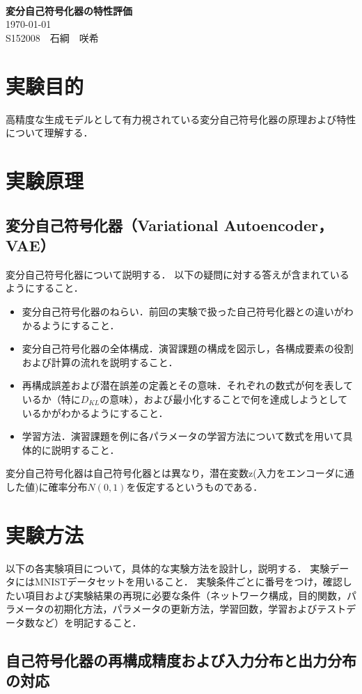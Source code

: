 \documentclass[12pt]{jsarticle}
\newcommand{\frontpage}[3]{%
\begin{center}
　\\
\vspace{15em}{\LARGE{}レポート課題}\\
　\\
{\Huge\bf#1}\\
\vspace{30em}
{\LARGE\today}\\
\vspace{2em}
{\LARGE#2　#3}
\end{center}
\thispagestyle{empty}
\clearpage
\setcounter{page}{1}
}
\begin{document}
\frontpage
{変分自己符号化器の特性評価}
{S152008}
{石綱　咲希}

\section{実験目的}

高精度な生成モデルとして有力視されている変分自己符号化器の原理および特性について理解する．

\section{実験原理}

\subsection{変分自己符号化器（Variational Autoencoder，VAE）}

変分自己符号化器について説明する．
以下の疑問に対する答えが含まれているようにすること．
\begin{itemize}
\item 変分自己符号化器のねらい．前回の実験で扱った自己符号化器との違いがわかるようにすること．
\item 変分自己符号化器の全体構成．演習課題の構成を図示し，各構成要素の役割および計算の流れを説明すること．
\item 再構成誤差および潜在誤差の定義とその意味．それぞれの数式が何を表しているか（特に$D_{KL}$の意味），および最小化することで何を達成しようとしているかがわかるようにすること．
\item 学習方法．演習課題を例に各パラメータの学習方法について数式を用いて具体的に説明すること．
\end{itemize}

変分自己符号化器は自己符号化器とは異なり，潜在変数z(入力をエンコーダに通した値)に確率分布$N(0,1)$を仮定するというものである．

\section{実験方法}


以下の各実験項目について，具体的な実験方法を設計し，説明する．
実験データにはMNISTデータセットを用いること．
実験条件ごとに番号をつけ，確認したい項目および実験結果の再現に必要な条件（ネットワーク構成，目的関数，パラメータの初期化方法，パラメータの更新方法，学習回数，学習およびテストデータ数など）を明記すること．


\subsection{自己符号化器の再構成精度および入力分布と出力分布の対応}
\end{document}
